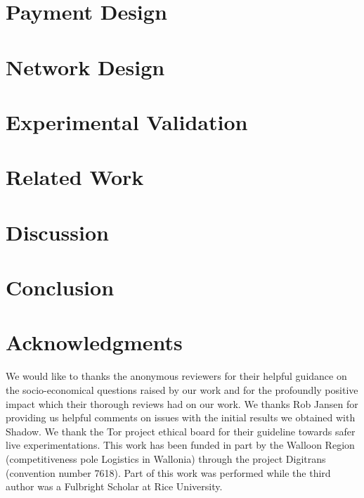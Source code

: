 \documentclass[USenglish,oneside,twocolumn]{article}
\begin{document}
\section{Payment Design}
\label{sec:payment}


\section{Network Design}
\label{sec:network}


\section{Experimental Validation}
\label{sec:experimentations}


\section{Related Work}
\label{sec:related_work}


\section{Discussion}

\label{sec:discussion}

\section{Conclusion}
\label{sec:conclusion}


\section*{Acknowledgments}

We would like to thanks the anonymous reviewers for their helpful
guidance on the socio-economical questions raised by our work and for
the profoundly positive impact which their thorough reviews had on our
work. We thanks Rob Jansen for providing us helpful comments on issues
with the initial results we obtained with Shadow. We thank the Tor
project ethical board for their guideline towards safer live
experimentations. This work has been funded in part by the Walloon
Region (competitiveness pole Logistics in Wallonia) through the
project Digitrans (convention number 7618). Part of this work was
performed while the third author was a Fulbright Scholar at Rice
University.
\end{document}
